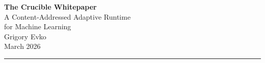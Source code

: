 \documentclass[11pt, a4paper]{article}
\begin{document}
\begin{center}
  \vspace*{1.2em}
  {\fontsize{22}{26}\selectfont\sffamily\bfseries The Crucible Whitepaper}\\[0.6em]
  {\large\sffamily A Content-Addressed Adaptive Runtime\\[0.15em]for Machine Learning}\\[2em]
  {\normalsize Grigory Evko}\\[0.4em]
  {\small\textcolor{black!45}{March 2026}}\\[2em]
  {\color{black!20}\rule{0.35\textwidth}{0.4pt}}
\end{center}
\thispagestyle{empty}
\vspace{1.5em}














\end{document}
